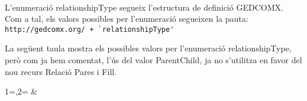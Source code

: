     \paragraph{}
    L'enumeració relationshipType segueix l'estructura de definició GEDCOMX. Com a tal, els valors possibles per l'enumeració segueixen la pauta:\\\verb|http://gedcomx.org/ + `relationshipType'|

    La següent taula mostra els possibles valors per l'enumeració relationshipType, però com ja hem comentat, l'ús del valor ParentChild, ja no s'utilitza en favor del nou recurs Relació Pares i Fill.

    \begin{center}
        {1=\one,2=\two}
        {\one&\two}
    \end{center}
